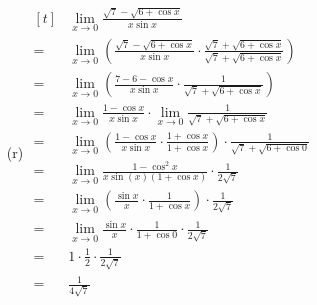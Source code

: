 \documentclass{article}
\begin{document}
\begin{multicols}{2}
\begin{itemize}
\item[(r)] 
$\begin{aligned}[t]
	&\lim\limits_{x\to0}\frac{\sqrt{7}-\sqrt{6+\cos x}}{x\sin x} \\
	=&\lim\limits_{x\to0}\left(\frac{\sqrt{7}-\sqrt{6+\cos x}}{x\sin x}\cdot\frac{\sqrt{7}+\sqrt{6+\cos x}}{\sqrt{7}+\sqrt{6+\cos x}}\right) \\
	=&\lim\limits_{x\to0}\left(\frac{7-6-\cos x}{x\sin x}\cdot\frac{1}{\sqrt{7}+\sqrt{6+\cos x}}\right) \\
	=&\lim\limits_{x\to0}\frac{1-\cos x}{x\sin x}\cdot\lim\limits_{x\to0}\frac{1}{\sqrt{7}+\sqrt{6+\cos x}} \\
	=&\lim\limits_{x\to0}\left(\frac{1-\cos x}{x\sin x}\cdot\frac{1+\cos x}{1+\cos x}\right)\cdot\frac{1}{\sqrt{7}+\sqrt{6+\cos0}} \\
	=&\lim\limits_{x\to0}\frac{1-\cos^2x}{x\sin\left(x\right)\left(1+\cos x\right)}\cdot\frac{1}{2\sqrt{7}} \\
	=&\lim\limits_{x\to0}\left(\frac{\sin x}{x}\cdot\frac{1}{1+\cos x}\right)\cdot\frac{1}{2\sqrt{7}} \\
	=&\lim\limits_{x\to0}\frac{\sin x}{x}\cdot\frac{1}{1+\cos0}\cdot\frac{1}{2\sqrt{7}} \\
	=&1\cdot\frac{1}{2}\cdot\frac{1}{2\sqrt{7}} \\
	=&\boxed{\frac{1}{4\sqrt{7}}} \\
\end{aligned}$

\end{itemize}
\end{multicols}
\end{document}
